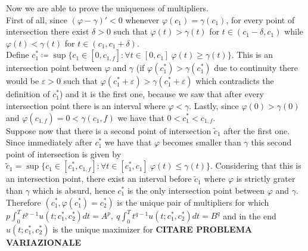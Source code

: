 \documentclass[corpo=11pt, stile=classica, tipotesi=custom,
greek, evenboxes, english]{toptesi}
\numberwithin{equation}{chapter}
\begin{document}
Now we are able to prove the uniqueness of multipliers.\\
First of all, since $(\varphi-\gamma)'<0$ whenever $\varphi(c_1) = \gamma(c_1)$, for every point of intersection there exist $\delta>0$ such that $\varphi(t) > \gamma(t)$ for $t \in (c_1 - \delta, c_1)$ while $\varphi(t) < \gamma(t)$ for $t \in (c_1, c_1 + \delta)$.\\
Define $c_1^* \coloneqq \sup \{c_1 \in [0,c_{1,f}] : \forall t \in [0,c_1] \ \varphi(t) \geq \gamma(t)\}$. This is an intersection point between $\varphi$ and $\gamma$ (if $\varphi(c_1^*) > \gamma(c_1^*)$ due to continuity there would be $\varepsilon > 0$ such that $\varphi(c_1^*+\varepsilon) > \gamma(c_1^*+\varepsilon)$ which contradicts the definition of $c_1^*$) and it is the first one, because we saw that after every intersection point there is an interval where $\varphi < \gamma$. Lastly, since $\varphi(0) > \gamma(0)$ and $\varphi(c_{1,f}) = 0 < \gamma(c_1,f)$ we have that $0 < c_1^* < c_{1,f}$.\\
Suppose now that there is a second point of intersection $\tilde{c}_1$ after the first one. Since immediately after $c_1^*$ we have that $\varphi$ becomes smaller than $\gamma$ this second point of intersection is given by $\tilde{c}_1 = \sup \{c_1 \in [c_1^*,c_{1,f}] : \forall t \in [c_1^*,c_1] \ \varphi(t) \leq \gamma(t)\}$. Considering that this is an intersection point, there exist an interval before $\tilde{c}_1$ where $\varphi$ is strictly grater than $\gamma$ which is absurd, hence $c_1^*$ is the only intersection point between $\varphi$ and $\gamma$.\\
Therefore $(c_1^*, \varphi(c_1^*) = c_2^*)$ is the unique pair of multipliers for which $p\int_0^T t^{p-1} u(t;c_1^*,c_2^*)dt = A^p,\ q\int_0^T t^{q-1} u(t;c_1^*,c_2^*)dt = B^q$ and in the end $u(t;c_1^*,c_2^*)$ is the unique maximizer for \textbf{CITARE PROBLEMA VARIAZIONALE}

\nocite{*}
\printbibliography


	
\end{document}
